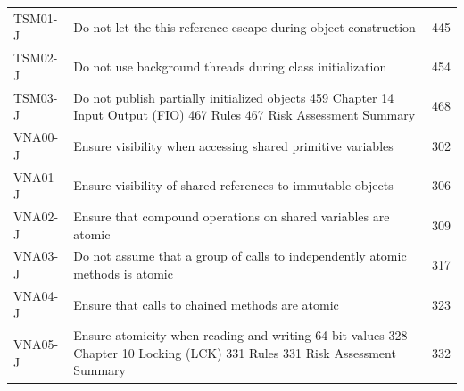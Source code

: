 \documentclass[11pt]{report}
\begin{document}
\begin{longtable}{@{}llr@{}}
TSM01-J & Do not let the this reference escape during object construction & 445\\
TSM02-J & Do not use background threads during class initialization & 454\\
TSM03-J & Do not publish partially initialized objects 459 Chapter 14 Input Output (FIO) 467 Rules 467 Risk Assessment Summary & 468\\
VNA00-J & Ensure visibility when accessing shared primitive variables & 302\\
VNA01-J & Ensure visibility of shared references to immutable objects & 306\\
VNA02-J & Ensure that compound operations on shared variables are atomic & 309\\
VNA03-J & Do not assume that a group of calls to independently atomic methods is atomic & 317\\
VNA04-J & Ensure that calls to chained methods are atomic & 323\\
VNA05-J & Ensure atomicity when reading and writing 64-bit values 328 Chapter 10 Locking (LCK) 331 Rules 331 Risk Assessment Summary & 332\\
\end{longtable}
\end{document}
